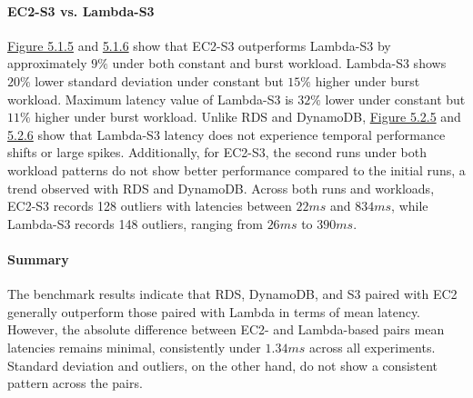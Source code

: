 \paragraph*{EC2-S3 vs. Lambda-S3}
\hyperref[fig:bar_s3_const]{Figure 5.1.5} and \hyperref[fig:bar_s3_bursty]{5.1.6} show that EC2-S3 outperforms Lambda-S3 by approximately $9\%$ under both constant and burst workload. Lambda-S3 shows $20\%$ lower standard deviation under constant but $15\%$ higher under burst workload. Maximum latency value of Lambda-S3 is $32\%$ lower under constant but $11\%$ higher under burst workload.
%
Unlike RDS and DynamoDB, \hyperref[fig:ts_s3_const]{Figure 5.2.5} and \hyperref[fig:ts_s3_bursty]{5.2.6} show that Lambda-S3 latency does not experience temporal performance shifts or large spikes. Additionally, for EC2-S3, the second runs under both workload patterns do not show better performance compared to the initial runs, a trend observed with RDS and DynamoDB.
%
Across both runs and workloads, EC2-S3 records 128 outliers with latencies between $22ms$ and $834ms$, while Lambda-S3 records 148 outliers, ranging from $26ms$ to $390ms$.

\paragraph*{Summary}
The benchmark results indicate that RDS, DynamoDB, and S3 paired with EC2 generally outperform those paired with Lambda in terms of mean latency. However, the absolute difference between EC2- and Lambda-based pairs mean latencies remains minimal, consistently under $1.34ms$ across all experiments. Standard deviation and outliers, on the other hand, do not show a consistent pattern across the pairs. 

